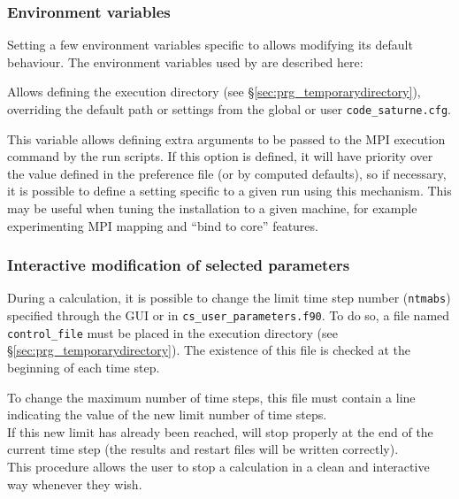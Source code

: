 {{{{{%
\subsubsection{Environment variables\label{sec:envcs}}

Setting a few environment variables specific to \CS allows modifying
its default behaviour. The environment variables used by \CS
are described here:


Allows defining the execution directory (see
\S\ref{sec:prg_temporarydirectory}),
overriding the default path or settings from the global
or user \texttt{code\_saturne.cfg}.


This variable allows defining extra arguments to be passed to
the MPI execution command by the run scripts.
If this option is defined, it will have priority over the value defined
in the preference file (or by computed defaults), so if necessary, it
is possible to define a setting specific to a given run using this
mechanism. This may be useful when tuning the installation to a given
machine, for example experimenting MPI mapping and ``bind to core''
features.

\subsubsection{Interactive modification of selected parameters}
\label{sec:prg_control_file}%
During a calculation, it is possible to change the limit time step number
(\texttt{ntmabs}) specified through the GUI or in \texttt{cs\_user\_parameters.f90}.
To do so, a file named \texttt{control\_file} must be placed in the
execution directory (see \S\ref{sec:prg_temporarydirectory}).
The existence of this file is checked at the beginning of each time step.

To change the maximum number of time steps, this file must contain a line
indicating the value of the new limit number of time steps.\\
If this new limit has already been reached,
 \CS will stop
properly at the end of the current time step (the results and restart files
will be written correctly).\\
This procedure allows the user to stop a calculation in a clean and interactive
way whenever they wish.

}}}}}
